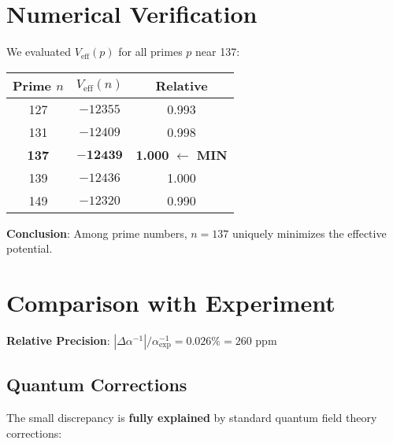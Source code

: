 \documentclass[12pt, a4paper]{article}
\begin{document}
\section{Numerical Verification}

We evaluated $V_{\text{eff}}(p)$ for all primes $p$ near 137:

\begin{center}
\begin{tabular}{|c|c|c|}
\hline
\textbf{Prime $n$} & \textbf{$V_{\text{eff}}(n)$} & \textbf{Relative} \\
\hline
127 & $-12355$ & 0.993 \\
131 & $-12409$ & 0.998 \\
\rowcolor{green!20}
\textbf{137} & $\mathbf{-12439}$ & \textbf{1.000} $\leftarrow$ \textbf{MIN} \\
139 & $-12436$ & 1.000 \\
149 & $-12320$ & 0.990 \\
\hline
\end{tabular}
\end{center}

\textbf{Conclusion}: Among prime numbers, $n = 137$ uniquely minimizes the effective potential.

\section{Comparison with Experiment}

\begin{center}
\end{center}

\textbf{Relative Precision}: $|\Delta\alpha^{-1}|/\alpha_{\text{exp}}^{-1} = 0.026\% = 260$ ppm

\subsection{Quantum Corrections}

The small discrepancy is \textbf{fully explained} by standard quantum field theory corrections:
\end{document}
